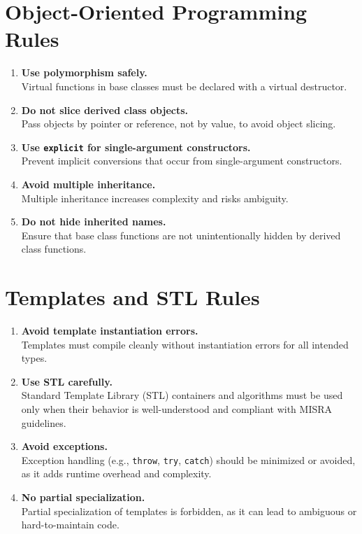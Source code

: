 \section{Object-Oriented Programming Rules}
\begin{enumerate}
    \item \textbf{Use polymorphism safely.} \\
    Virtual functions in base classes must be declared with a virtual destructor.

    \item \textbf{Do not slice derived class objects.} \\
    Pass objects by pointer or reference, not by value, to avoid object slicing.

    \item \textbf{Use \texttt{explicit} for single-argument constructors.} \\
    Prevent implicit conversions that occur from single-argument constructors.

    \item \textbf{Avoid multiple inheritance.} \\
    Multiple inheritance increases complexity and risks ambiguity.

    \item \textbf{Do not hide inherited names.} \\
    Ensure that base class functions are not unintentionally hidden by derived class functions.
\end{enumerate}

\section{Templates and STL Rules}
\begin{enumerate}
    \item \textbf{Avoid template instantiation errors.} \\
    Templates must compile cleanly without instantiation errors for all intended types.

    \item \textbf{Use STL carefully.} \\
    Standard Template Library (STL) containers and algorithms must be used only when their behavior is well-understood and compliant with MISRA guidelines.

    \item \textbf{Avoid exceptions.} \\
    Exception handling (e.g., \texttt{throw}, \texttt{try}, \texttt{catch}) should be minimized or avoided, as it adds runtime overhead and complexity.

    \item \textbf{No partial specialization.} \\
    Partial specialization of templates is forbidden, as it can lead to ambiguous or hard-to-maintain code.
\end{enumerate}

